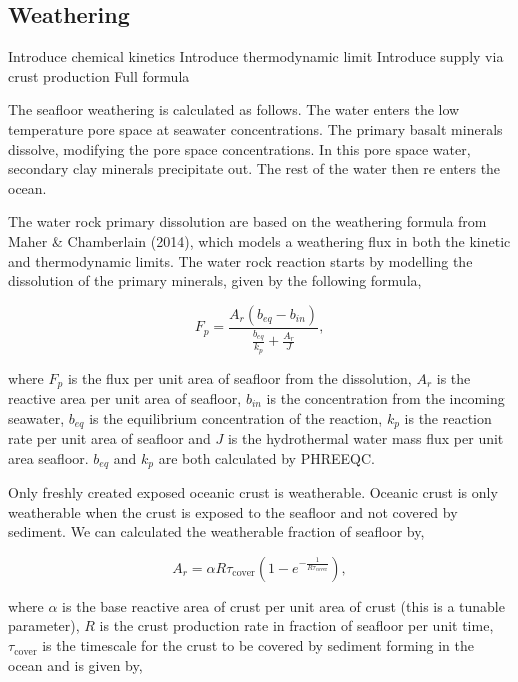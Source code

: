 \documentclass[fleqn,usenatbib]{mnras}
\begin{document}
\subsection{Weathering}

Introduce chemical kinetics
Introduce thermodynamic limit
Introduce supply via crust production
Full formula

The seafloor weathering is calculated as follows. The water enters the low temperature pore space at seawater concentrations. The primary basalt minerals dissolve, modifying the pore space concentrations. In this pore space water, secondary clay minerals precipitate out. The rest of the water then re enters the ocean.

The water rock primary dissolution are based on the weathering formula from Maher & Chamberlain (2014), which models a weathering flux in both the kinetic and thermodynamic limits. The water rock reaction starts by modelling the dissolution of the primary minerals, given by the following formula,

\begin{equation}
    F_p=\frac{A_r(b_{eq} - b_{in})}{\frac{b_{eq}}{k_p} + \frac{A_r}{J}},
\end{equation}

where $F_p$ is the flux per unit area of seafloor from the dissolution, $A_r$ is the reactive area per unit area of seafloor, $b_{in}$ is the concentration from the incoming seawater, $b_{eq}$ is the equilibrium concentration of the reaction, $k_p$ is the reaction rate per unit area of seafloor and $J$ is the hydrothermal water mass flux per unit area seafloor. $b_{eq}$ and $k_p$ are both calculated by PHREEQC.

Only freshly created exposed oceanic crust is weatherable. Oceanic crust is only weatherable when the crust is exposed to the seafloor and not covered by sediment. We can calculated the weatherable fraction of seafloor by,

\begin{equation}
    A_r = \alpha R \tau_{\mathrm{cover}} \left( 1 - e^{-\frac{1}{R \tau_{\mathrm{cover}}}} \right) ,
\end{equation}

where $\alpha$ is the base reactive area of crust per unit area of crust (this is a tunable parameter), $R$ is the crust production rate in fraction of seafloor per unit time, $\tau_{\mathrm{cover}}$ is the timescale for the crust to be covered by sediment forming in the ocean and is given by,
\end{document}
